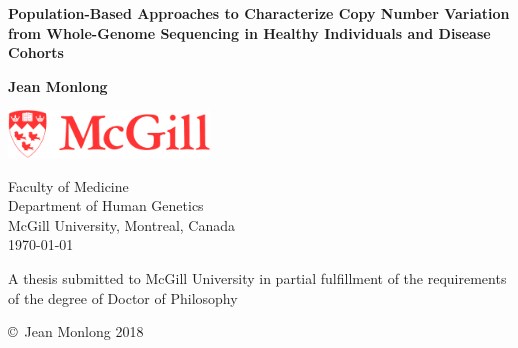 \begin{titlepage}
  \begin{center}
    \vspace*{1cm}
    
    \LARGE
    \textbf{Population-Based Approaches to Characterize Copy Number Variation from Whole-Genome Sequencing in Healthy Individuals and Disease Cohorts}
    
    \vspace{0.5cm}
    \Large
    
    \vspace{1.5cm}
    
    \textbf{Jean Monlong}
    
    \vspace{1.5cm}
    
    \includegraphics[width=0.4\textwidth]{mcgill.png}
    
    \Large
    Faculty of Medicine\\
    Department of Human Genetics\\
    McGill University, Montreal, Canada\\
    \today

    \vfill

    \large A thesis submitted to McGill University in partial fulfillment of the requirements of the degree of Doctor of Philosophy
        
    \vfill
    \small\copyright~Jean Monlong 2018
  \end{center}
\end{titlepage}

